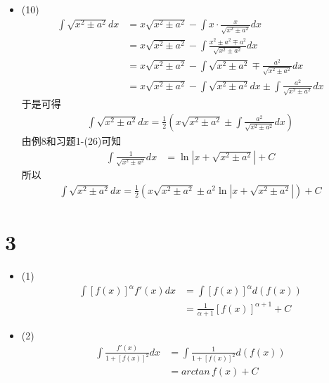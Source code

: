 \documentclass{article}
\begin{document}
\begin{itemize}
  \item (10)
        \begin{align*}
          \int \sqrt{x^2 \pm a^2} dx
           & = x \sqrt{x^2 \pm a^2} - \int x \cdot \frac{x}{\sqrt{x^2 \pm a^2}} dx                          \\
           & = x \sqrt{x^2 \pm a^2} - \int \frac{x^2 \pm a^2 \mp a^2}{\sqrt{x^2 \pm a^2}} dx                \\
           & = x \sqrt{x^2 \pm a^2} - \int \sqrt{x^2 \pm a^2} \mp \frac{a^2}{\sqrt{x^2 \pm a^2}} dx         \\
           & = x \sqrt{x^2 \pm a^2} - \int \sqrt{x^2 \pm a^2} dx \pm \int \frac{a^2}{\sqrt{x^2 \pm a^2}} dx
        \end{align*}
        于是可得
        \begin{align*}
          \int \sqrt{x^2 \pm a^2} dx = \frac{1}{2} \left(x \sqrt{x^2 \pm a^2} \pm \int \frac{a^2}{\sqrt{x^2 \pm a^2}} dx \right)
        \end{align*}
        由例8和习题1-(26)可知
        \begin{align*}
          \int \frac{1}{\sqrt{x^2 \pm a^2}} dx
           & = \ln |x + \sqrt{x^2 \pm a^2}| + C
        \end{align*}
        所以
        \begin{align*}
          \int \sqrt{x^2 \pm a^2} dx = \frac{1}{2} \left(x \sqrt{x^2 \pm a^2} \pm a^2\ln |x + \sqrt{x^2 \pm a^2}| \right) + C
        \end{align*}
\end{itemize}

\section*{3}

\begin{itemize}
  \item (1)
        \begin{align*}
          \int [f(x)]^{\alpha} f'(x)dx
           & = \int [f(x)]^{\alpha} d(f(x))                 \\
           & = \frac{1}{\alpha + 1} [f(x)]^{\alpha + 1} + C
        \end{align*}
  \item (2)
        \begin{align*}
          \int \frac{f'(x)}{1 + [f(x)]^2}dx
           & = \int \frac{1}{1 + [f(x)]^2}d(f(x)) \\
           & = arctan \, f(x) + C
        \end{align*}

\end{itemize}
\end{document}
